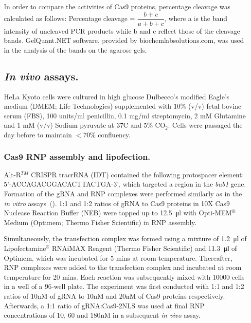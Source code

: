 \documentclass[11pt]{article}
\begin{document}
\label{subsubsec:Cas9 RNP assay analysis}
In order to compare the activities of Cas9 proteins, percentage cleavage was calculated as follows: Percentage cleavage = $\dfrac{b + c }{ a + b + c }$, where a is the band intensity of uncleaved PCR products while b and c reflect those of the cleavage bands. GelQuant.NET software, provided by biochemlabsolutions.com, was used in the analysis of the bands on the agarose gels. 

\subsection{\textit{In vivo} assays.}
HeLa Kyoto cells were cultured in high glucose Dulbecco's modified Eagle's medium (DMEM; Life Technologies) supplemented with 10\% (v/v) fetal bovine serum (FBS), 100 units/ml penicillin, 0.1 mg/ml streptomycin, 2 mM Glutamine and 1 mM (v/v) Sodium pyruvate at 37\degree C and 5\% CO$_{2}$. Cells were passaged the day before to maintain $<$70\% confluency.

\subsubsection{Cas9 RNP assembly and lipofection.}
Alt-R$^{TM}$ CRISPR tracrRNA (IDT) contained the following protospacer element: \\ 5'-ACCAGACGGACACTTACTGA-3', which targeted a region in the \textit{bub1} gene. Formation of the gRNA and RNP complexes were performed similarly as in the \textit{in vitro} assays~(). 1:1 and 1:2 ratios of gRNA to Cas9 proteins in 10X Cas9 Nuclease Reaction Buffer (NEB) were topped up to \SI{12.5}{\micro\litre} with Opti-MEM$^{\circledR}$ Medium (Optimem; Thermo Fisher Scientific) in RNP assembly. 

Simultaneously, the transfection complex was formed using a mixture of \SI{1.2}{\micro\litre} of Lipofectamine$^{\circledR}$ RNAiMAX Reagent (Thermo Fisher Scientific) and \SI{11.3}{\micro\litre} of Optimem, which was incubated for 5 mins at room temperature. Thereafter, RNP complexes were added to the transfection complex and incubated at room temperature for 20 mins. Each reaction was subsequently mixed with 10000 cells in a well of a 96-well plate. The experiment was first conducted with 1:1 and 1:2 ratios of 10nM of gRNA to 10nM and 20nM of Cas9 proteins respectively. Afterwards, a 1:1 ratio of gRNA:Cas9-2NLS was used at final RNP concentrations of 10, 60 and 180nM in a subsequent \textit{in vivo} assay.
\end{document}
